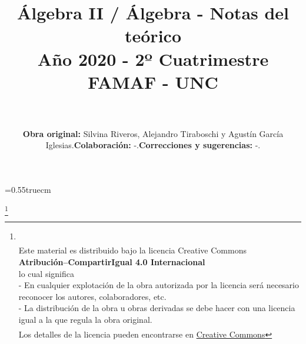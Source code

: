 \documentclass[a4paper,12pt,twoside,spanish,reqno]{amsbook}
\numberwithin{equation}{section}
\theoremstyle{definition}
\theoremstyle{remark}
\begin{document}
    \baselineskip=0.55truecm %
    
    
    \title{Álgebra II / Álgebra - Notas del teórico  \\ Año 2020 - 2º Cuatrimestre  \\ FAMAF  - UNC 
    }
    
    \maketitle
    
    \newpage
    
    \author{
        ${}^{}$
        \\${}^{}$
        \\${}^{}$
         \\${}^{}$\\ 
        \flushleft 
        \begin{itemize}
            \item \textbf{Obra original:}  Silvina Riveros,  Alejandro Tiraboschi y Agustín García  Iglesias. 
            \item \textbf{Colaboración: } -.   
            \item \textbf{Correcciones y sugerencias:} -. 
        \end{itemize}
    }
    
    
    
    \vskip 2cm 
    \thanks{
         \\
        ${}^{}$\\
        {\flushleft 
            Este material es distribuido bajo la licencia Creative Commons} \\
        {\center \textbf{Atribución--CompartirIgual 4.0 Internacional}}
        \\ 
        \center  lo cual significa 
        \\
        \flushleft
        - En cualquier explotación de la obra autorizada por la licencia será necesario reconocer los autores, colaboradores, etc.\\
        - La distribución de la obra u obras derivadas se debe hacer con una licencia igual a la que regula la obra original.\\
        ${}^{}$
        \\
        Los detalles de la licencia pueden encontrarse en \href{https://creativecommons.org/licenses/by/4.0/deed.es}{Creative Commons}
    }
    
\end{document}
